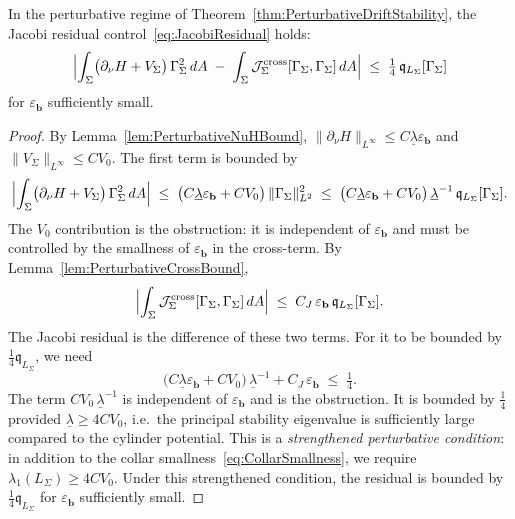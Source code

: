 \begin{theorem}\label{thm:PerturbativeJacobiResidual}
In the perturbative regime of Theorem~\ref{thm:PerturbativeDriftStability}, the Jacobi residual control~\eqref{eq:JacobiResidual} holds:
\begin{equation}\label{eq:PerturbativeJacobiResidual}
    \Bigl|\int_\Sigma\bigl(\partial_\nu H + V_\Sigma\bigr)\,\Gamma_\Sigma^2\,dA
    \;-\;\int_\Sigma\mathcal J_\Sigma^{\mathrm{cross}}[\Gamma_\Sigma,\Gamma_\Sigma]\,dA\Bigr|
    \;\le\;\tfrac14\,\mathfrak q_{L_\Sigma}[\Gamma_\Sigma]
\end{equation}
for $\varepsilon_{\mathbf b}$ sufficiently small.
\end{theorem}

\begin{proof}
By Lemma~\ref{lem:PerturbativeNuHBound}, $\|\partial_\nu H\|_{L^\infty}\le C\underline\lambda\varepsilon_{\mathbf b}$ and $\|V_\Sigma\|_{L^\infty}\le CV_0$. The first term is bounded by
\[
    \Bigl|\int_\Sigma\bigl(\partial_\nu H + V_\Sigma\bigr)\,\Gamma_\Sigma^2\,dA\Bigr|
    \;\le\;
    \bigl(C\underline\lambda\varepsilon_{\mathbf b}+CV_0\bigr)\,\|\Gamma_\Sigma\|_{L^2}^2
    \;\le\;
    \bigl(C\underline\lambda\varepsilon_{\mathbf b}+CV_0\bigr)\,\underline\lambda^{-1}\,\mathfrak q_{L_\Sigma}[\Gamma_\Sigma].
\]
The $V_0$ contribution is the obstruction: it is independent of $\varepsilon_{\mathbf b}$ and must be controlled by the smallness of $\varepsilon_{\mathbf b}$ in the cross-term. By Lemma~\ref{lem:PerturbativeCrossBound},
\[
    \Bigl|\int_\Sigma\mathcal J_\Sigma^{\mathrm{cross}}[\Gamma_\Sigma,\Gamma_\Sigma]\,dA\Bigr|
    \;\le\;C_J\,\varepsilon_{\mathbf b}\,\mathfrak q_{L_\Sigma}[\Gamma_\Sigma].
\]
The Jacobi residual is the difference of these two terms. For it to be bounded by $\tfrac14\mathfrak q_{L_\Sigma}$, we need
\[
    \bigl(C\underline\lambda\varepsilon_{\mathbf b}+CV_0\bigr)\,\underline\lambda^{-1}+C_J\,\varepsilon_{\mathbf b}\;\le\;\tfrac14 .
\]
The term $CV_0\,\underline\lambda^{-1}$ is independent of $\varepsilon_{\mathbf b}$ and is the obstruction. It is bounded by $\tfrac14$ provided $\underline\lambda\ge 4CV_0$, i.e.\ the principal stability eigenvalue is sufficiently large compared to the cylinder potential. This is a \emph{strengthened perturbative condition}: in addition to the collar smallness~\eqref{eq:CollarSmallness}, we require $\lambda_1(L_\Sigma)\ge 4CV_0$. Under this strengthened condition, the residual is bounded by $\tfrac14\mathfrak q_{L_\Sigma}$ for $\varepsilon_{\mathbf b}$ sufficiently small.
\end{proof}

